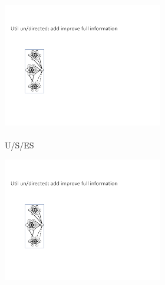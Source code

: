 \begin{figure}[t]
    \centering
    \begin{subfigure}{0.6\textwidth}
    \centering  
        \begin{subfigure}{0.15\textwidth}
        \renewcommand\thesubfigure{\alph{subfigure}1}
            \centering
        \includegraphics[page=5,width=\textwidth]{Graphs/graphs.pdf}
        \caption{\\U/S/ES}
        \label{fig:util_size_add}
        \end{subfigure}
        \hfill
        \begin{subfigure}{0.15\textwidth}
            \addtocounter{subfigure}{-1}
            \renewcommand\thesubfigure{\alph{subfigure}2}
            \centering
        \includegraphics[page=23,width=\textwidth]{Graphs/graphs.pdf}

\end{subfigure}
\end{subfigure}
\end{figure}
